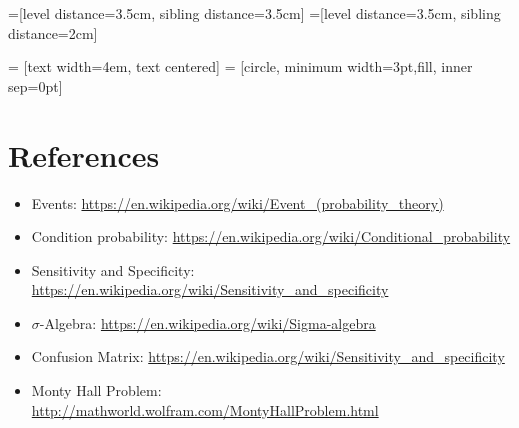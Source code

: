 \documentclass[11pt]{article}
\begin{document}
\begin{latex}


=[level distance=3.5cm, sibling distance=3.5cm]
=[level distance=3.5cm, sibling distance=2cm]

 = [text width=4em, text centered]
 = [circle, minimum width=3pt,fill, inner sep=0pt]

\end{latex}

\section{References}
\label{sec:orgde29740}
\begin{itemize}
\item Events: \url{https://en.wikipedia.org/wiki/Event\_(probability\_theory)}
\item Condition probability: \url{https://en.wikipedia.org/wiki/Conditional\_probability}
\item Sensitivity and Specificity:
\url{https://en.wikipedia.org/wiki/Sensitivity\_and\_specificity}
\item \(\sigma\)-Algebra: \url{https://en.wikipedia.org/wiki/Sigma-algebra}
\item Confusion Matrix:
\url{https://en.wikipedia.org/wiki/Sensitivity\_and\_specificity}
\item Monty Hall Problem: \url{http://mathworld.wolfram.com/MontyHallProblem.html}
\end{itemize}
\end{document}
